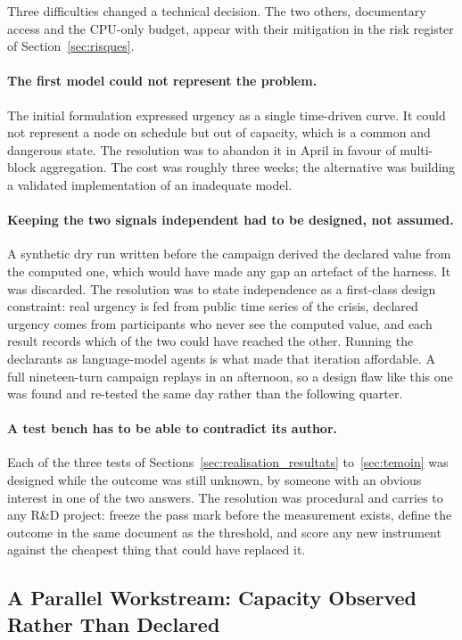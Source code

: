 Three difficulties changed a technical decision. The two others, documentary
access and the CPU-only budget, appear with their mitigation in the risk register
of Section~\ref{sec:risques}.

\paragraph{The first model could not represent the problem.}
The initial formulation expressed urgency as a single time-driven curve. It could not
represent a node on schedule but out of capacity, which is a common and dangerous state. The
resolution was to abandon it in April in favour of multi-block aggregation. The cost was
roughly three weeks; the alternative was building a validated implementation of an
inadequate model.

\paragraph{Keeping the two signals independent had to be designed, not assumed.}
A synthetic dry run written before the campaign derived the declared value from the computed
one, which would have made any gap an artefact of the harness. It was discarded. The
resolution was to state independence as a first-class design constraint: real urgency is fed
from public time series of the crisis, declared urgency comes from participants who never see
the computed value, and each result records which of the two could have reached the other.
Running the declarants as language-model agents is what made that iteration affordable. A full
nineteen-turn campaign replays in an afternoon, so a design flaw like this one was found and
re-tested the same day rather than the following quarter.

\paragraph{A test bench has to be able to contradict its author.}
Each of the three tests of Sections~\ref{sec:realisation_resultats} to~\ref{sec:temoin} was
designed while the outcome was still unknown, by someone with an obvious interest in one of the
two answers. The resolution was procedural and carries to any R\&D project: freeze the pass
mark before the measurement exists, define the outcome in the same document as the threshold,
and score any new instrument against the cheapest thing that could have replaced it.

\subsection{A Parallel Workstream: Capacity Observed Rather Than Declared}
\label{sec:realisation_volume}

